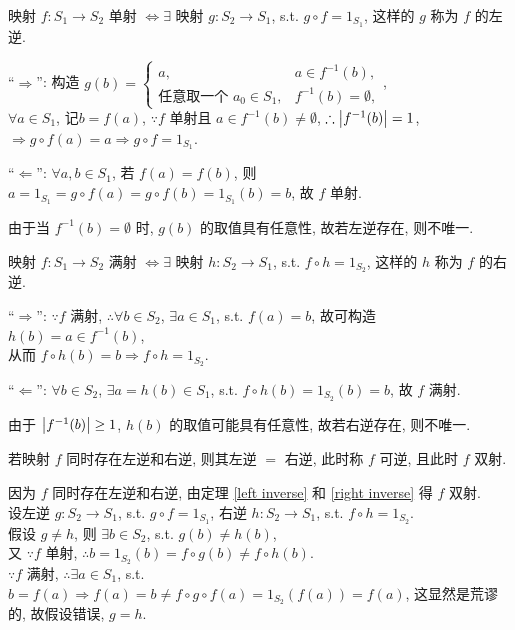 \documentclass{note}
\begin{document}
\begin{thm}\label{left inverse}
    映射 $f:S_1\rightarrow S_2$ 单射 $\Longleftrightarrow\exists$ 映射 $g:S_2\rightarrow S_1$, s.t. $g\circ f=1_{S_1}$, 这样的 $g$ 称为 $f$ 的左逆.
\end{thm}
\begin{pf}
    ``$\Longrightarrow$'': 构造 $g(b)=\left\{\begin{array}{ll}
        a,&a\in f^{-1}(b),\\
        \text{任意取一个 }a_0\in S_1,&f^{-1}(b)=\emptyset,
    \end{array}\right.$,\\
    $\forall a\in S_1$, 记$b=f(a)$, $\because f$ 单射且 $a\in f^{-1}(b)\neq\emptyset$, $\therefore\left\lvert f^{-1}(b)\right\rvert=1$,\\
    $\Longrightarrow g\circ f(a)=a\Longrightarrow g\circ f=1_{S_1}$.

    ``$\Longleftarrow$'': $\forall a,b\in S_1$, 若 $f(a)=f(b)$, 则 $a=1_{S_1}=g\circ f(a)=g\circ f(b)=1_{S_1}(b)=b$, 故 $f$ 单射.
\end{pf}

由于当 $f^{-1}(b)=\emptyset$ 时, $g(b)$ 的取值具有任意性, 故若左逆存在, 则不唯一.

\begin{thm}\label{right inverse}
    映射 $f:S_1\rightarrow S_2$ 满射 $\Longleftrightarrow\exists$ 映射 $h:S_2\rightarrow S_1$, s.t. $f\circ h=1_{S_2}$, 这样的 $h$ 称为 $f$ 的右逆.
\end{thm}
\begin{pf}
    ``$\Longrightarrow$'': $\because f$ 满射, $\therefore\forall b\in S_2$, $\exists a\in S_1$, s.t. $f(a)=b$, 故可构造 $h(b)=a\in f^{-1}(b)$,\\
    从而 $f\circ h(b)=b\Longrightarrow f\circ h=1_{S_2}$.

    ``$\Longleftarrow$'': $\forall b\in S_2$, $\exists a=h(b)\in S_1$, s.t. $f\circ h(b)=1_{S_2}(b)=b$, 故 $f$ 满射.
\end{pf}

由于 $\left\lvert f^{-1}(b)\right\rvert\geq 1$, $h(b)$ 的取值可能具有任意性, 故若右逆存在, 则不唯一.

\begin{thm}
    若映射 $f$ 同时存在左逆和右逆, 则其左逆 $=$ 右逆, 此时称 $f$ 可逆, 且此时 $f$ 双射.
\end{thm}
\begin{pf}
    因为 $f$ 同时存在左逆和右逆, 由定理 \ref{left inverse} 和 \ref{right inverse} 得 $f$ 双射.\\
    设左逆 $g:S_2\rightarrow S_1$, s.t. $g\circ f=1_{S_1}$, 右逆 $h:S_2\rightarrow S_1$, s.t. $f\circ h=1_{S_2}$.\\
    假设 $g\neq h$, 则 $\exists b\in S_2$, s.t. $g(b)\neq h(b)$,\\
    又 $\because f$ 单射, $\therefore b=1_{S_2}(b)=f\circ g(b)\neq f\circ h(b)$.\\
    $\because f$ 满射, $\therefore\exists a\in S_1$, s.t. $b=f(a)\Longrightarrow f(a)=b\neq f\circ g\circ f(a)=1_{S_2}(f(a))=f(a)$, 这显然是荒谬的, 故假设错误, $g=h$.
\end{pf}
\end{document}
